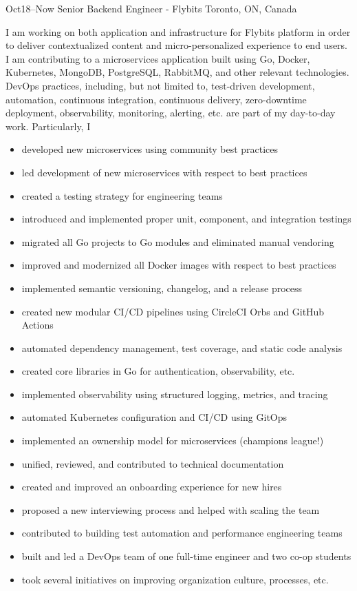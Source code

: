 \documentclass[]{cv-style}                     %
\begin{document}
\begin{entrylist}

  \entry
  {\small Oct18--Now}
  {Senior Backend Engineer - Flybits}
  {Toronto, ON, Canada}
  {I am working on both application and infrastructure for Flybits platform in order to deliver contextualized content and micro-personalized experience to end users.
   I am contributing to a microservices application built using Go, Docker, Kubernetes, MongoDB, PostgreSQL, RabbitMQ, and other relevant technologies. \\
   DevOps practices, including, but not limited to, test-driven development, automation, continuous integration, continuous delivery, zero-downtime deployment, observability, monitoring, alerting, etc. are part of my day-to-day work. Particularly, I 
     \begin{itemize}
       \item developed new microservices using community best practices
       \item led development of new microservices with respect to best practices
       \item created a testing strategy for engineering teams
       \item introduced and implemented proper unit, component, and integration testings
       \item migrated all Go projects to Go modules and eliminated manual vendoring
       \item improved and modernized all Docker images with respect to best practices
       \item implemented semantic versioning, changelog, and a release process
       \item created new modular CI/CD pipelines using CircleCI Orbs and GitHub Actions
       \item automated dependency management, test coverage, and static code analysis
       \item created core libraries in Go for authentication, observability, etc.
       \item implemented observability using structured logging, metrics, and tracing
       \item automated Kubernetes configuration and CI/CD using GitOps
       \item implemented an ownership model for microservices (champions league!)
       \item unified, reviewed, and contributed to technical documentation
       \item created and improved an onboarding experience for new hires
       \item proposed a new interviewing process and helped with scaling the team
       \item contributed to building test automation and performance engineering teams
       \item built and led a DevOps team of one full-time engineer and two co-op students
       \item took several initiatives on improving organization culture, processes, etc.
     \end{itemize}
   }


\end{entrylist}
\end{document}
